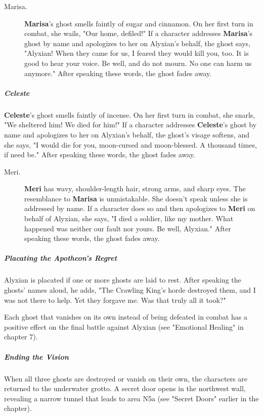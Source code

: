 \documentclass[10pt,a4paper,twoside,fancy,bg=print,twocolumn,openany,nodeprecatedcode]{dndbook}
\begin{document}
\begin{description}
\item[Marisa.]
\textbf{Marisa}'s ghost smells faintly of sugar and cinnamon. On her first turn in combat, she wails, "Our home, defiled!" If a character addresses \textbf{Marisa}'s ghost by name and apologizes to her on Alyxian's behalf, the ghost says, "Alyxian! When they came for us, I feared they would kill you, too. It is good to hear your voice. Be well, and do not mourn. No one can harm us anymore." After speaking these words, the ghost fades away.
\end{description}

\subparagraph{Celeste}
\textbf{Celeste}'s ghost smells faintly of incense. On her first turn in combat, she snarls, "We sheltered him! We died for him!" If a character addresses \textbf{Celeste}'s ghost by name and apologizes to her on Alyxian's behalf, the ghost's visage softens, and she says, "I would die for you, moon-cursed and moon-blessed. A thousand times, if need be." After speaking these words, the ghost fades away.


\begin{description}
\item[Meri.]
\textbf{Meri} has wavy, shoulder-length hair, strong arms, and sharp eyes. The resemblance to \textbf{Marisa} is unmistakable. She doesn't speak unless she is addressed by name. If a character does so and then apologizes to \textbf{Meri} on behalf of Alyxian, she says, "I died a soldier, like my mother. What happened was neither our fault nor yours. Be well, Alyxian." After speaking these words, the ghost fades away.
\end{description}

\subparagraph{Placating the Apotheon's Regret}
Alyxian is placated if one or more ghosts are laid to rest. After speaking the ghosts' names aloud, he adds, "The Crawling King's horde destroyed them, and I was not there to help. Yet they forgave me. Was that truly all it took?"

Each ghost that vanishes on its own instead of being defeated in combat has a positive effect on the final battle against Alyxian (see "Emotional Healing" in chapter 7).

\subparagraph{Ending the Vision}
When all three ghosts are destroyed or vanish on their own, the characters are returned to the underwater grotto. A secret door opens in the northwest wall, revealing a narrow tunnel that leads to area N5a (see "Secret Doors" earlier in the chapter).
\end{document}
